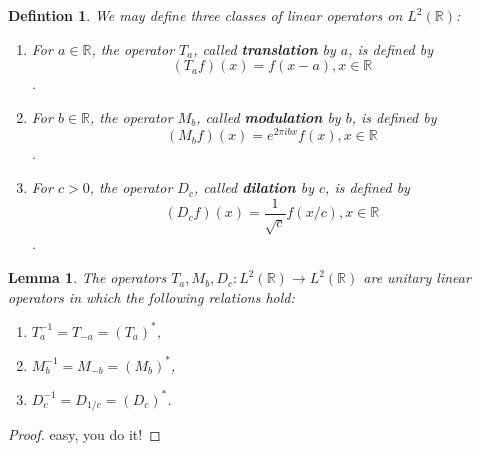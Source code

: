 \documentclass{article}
\newtheorem{defn}{Defintion}[section]
\newtheorem{lem}[thm]{Lemma}
\begin{document}
\begin{defn}
We may define three classes of linear operators on $L^2(\mathbb{R})$:
\begin{enumerate}
\item For $a\in\mathbb{R}$, the operator $T_a$, called \textbf{translation} by
      $a$, is defined by \[(T_a f)(x) = f(x-a), x\in\mathbb{R}\].
\item For $b\in\mathbb{R}$, the operator $M_b$, called \textbf{modulation} by
      $b$, is defined by \[(M_b f)(x) = e^{2\pi i b x} f(x), x\in\mathbb{R}\].
\item For $c>0$, the operator $D_c$, called \textbf{dilation} by $c$, is defined
      by \[(D_c f)(x) = \frac{1}{\sqrt{c}} f(x/c), x\in\mathbb{R}\].
\end{enumerate}
\end{defn}

\begin{lem}
The operators $T_a,M_b,D_c : L^2(\mathbb{R}) \to L^2(\mathbb{R})$ are unitary
linear operators in which the following relations hold:
\begin{enumerate}
\item $T_a^{-1} = T_{-a} = (T_a)^{*}$,
\item $M_b^{-1} = M_{-b} = (M_b)^{*}$,
\item $D_c^{-1} = D_{1/c} = (D_c)^{*}$.
\end{enumerate}
\end{lem}

\begin{proof}
easy, you do it!
\end{proof}
\end{document}
